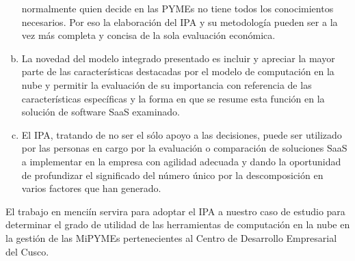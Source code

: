 \begin{enumerate}[a.]
            normalmente quien decide en las PYMEs no tiene todos los conocimientos
            necesarios. Por eso la elaboración del IPA y su metodología pueden
            ser a la vez más completa y concisa de la sola evaluación económica.
      \item La novedad del modelo integrado presentado es incluir y apreciar la
            mayor parte de las características destacadas por el modelo de computación
            en la nube y permitir la evaluación de su importancia con referencia
            de las características específicas y la forma en que se resume esta
            función en la solución de software SaaS examinado.
      \item El IPA, tratando de no ser el sólo apoyo a las decisiones, puede ser
            utilizado por las personas en cargo por la evaluación o comparación de
            soluciones SaaS a implementar en la empresa con agilidad adecuada y
            dando la oportunidad de profundizar el significado del número único
            por la descomposición en varios factores que han generado.
\end{enumerate}

El trabajo en menciín servira para adoptar el IPA a nuestro caso de estudio para
determinar el grado de utilidad de las herramientas de computación en la nube
en la gestión de las MiPYMEs pertenecientes al Centro de Desarrollo Empresarial
del Cusco.


